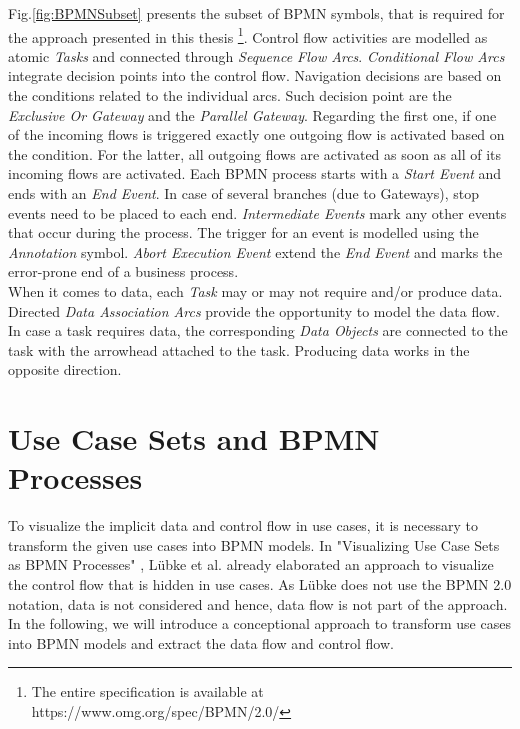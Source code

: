 \noindent
Fig.\ref{fig:BPMNSubset} presents the subset of BPMN symbols, that is required for the approach presented in this thesis \footnote{The entire specification is available at https://www.omg.org/spec/BPMN/2.0/}. Control flow activities are modelled as atomic \textit{Tasks} and connected through \textit{Sequence Flow Arcs}. \textit{Conditional Flow Arcs} integrate decision points into the control flow. Navigation decisions are based on the conditions related to the individual arcs. Such decision point are the \textit{Exclusive Or Gateway} and the \textit{Parallel Gateway}. Regarding the first one, if one of the incoming flows is triggered exactly one outgoing flow is activated based on the condition. For the latter, all outgoing flows are activated as soon as all of its incoming flows are activated. Each BPMN process starts with a \textit{Start Event} and ends with an \textit{End Event}. In case of several branches (due to Gateways), stop events need to be placed to each end. \textit{Intermediate Events} mark any other events that occur during the process. The trigger for an event is modelled using the \textit{Annotation} symbol. \textit{Abort Execution Event} extend the \textit{End Event} and marks the error-prone end of a business process. \\
When it comes to data, each \textit{Task} may or may not require and/or produce data. Directed \textit{Data Association Arcs} provide the opportunity to model the data flow. In case a task requires data, the corresponding \textit{Data Objects} are connected to the task with the arrowhead attached to the task. Producing data works in the opposite direction. \\









\section{Use Case Sets and BPMN Processes}
\label{sec:Fundamentals:TransformUCtoBPMN}
To visualize the implicit data and control flow in use cases, it is necessary to transform the given use cases into BPMN models. In "Visualizing Use Case Sets as BPMN Processes" \cite{VisualizeBPMN}, Lübke et al. already elaborated an approach to visualize the control flow that is hidden in use cases. As Lübke does not use the BPMN 2.0 notation, data is not considered and hence, data flow is not part of the approach. In the following, we will introduce a conceptional approach to transform use cases into BPMN models and extract the data flow and control flow.


